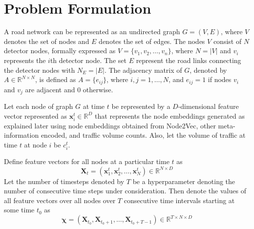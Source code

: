 \section{\textbf{Problem Formulation}}\label{sec:problem-for}

A road network can be represented as an undirected graph \( G = (V, E) \), where \( V \) denotes the set of nodes and \( E \) denotes the set of edges. The nodes \( V \) consist of \( N \) detector nodes, formally expressed as \( V = \{v_1, v_2, \ldots, v_n\} \), where \( N = |V| \) and \( v_i \) represents the \( i \)th detector node. The set \( E \) represent the road links connecting the detector nodes with \( N_E = |E| \). The adjacency matrix of \( G \), denoted by \( A \in \mathbb{R}^{N \times N} \), is defined as \( A = \{e_{ij}\} \), where \( i, j = 1, \ldots, N \), and \( e_{ij} = 1 \) if nodes \( v_i \) and \( v_j \) are adjacent and \( 0 \) otherwise.

Let each node of graph $G$ at time $t$ be represented by a $D$-dimensional feature vector represented as $\mathbf{x}_i^t \in \mathbb{R}^D$ that represents the node embeddings generated as explained later using node embeddings obtained from Node2Vec, other meta-information encoded, and traffic volume counts. Also, let the volume of traffic at time $t$ at node $i$ be $c_i^t$.

Define feature vectors for all nodes at a particular time $t$ as
\begin{equation*}
    \mathbf{X}_t = (\mathbf{x}_1^t, \mathbf{x}_2^t, \ldots, \mathbf{x}_N^t) \in \mathbb{R}^{N \times D} \tag{1}
\end{equation*}
Let the number of timesteps denoted by $T$ be a hyperparameter denoting the number of consecutive time steps under consideration. Then denote the values of all feature vectors over all nodes over $T$ consecutive time intervals starting at some time $t_0$ as
\begin{equation}
    \bm{\chi} = (\mathbf{X}_{t_0}, \mathbf{X}_{t_0+1}, \ldots, \mathbf{X}_{t_0+T-1}) \in \mathbb{R}^{T \times N \times D} \tag{2}
\end{equation}

